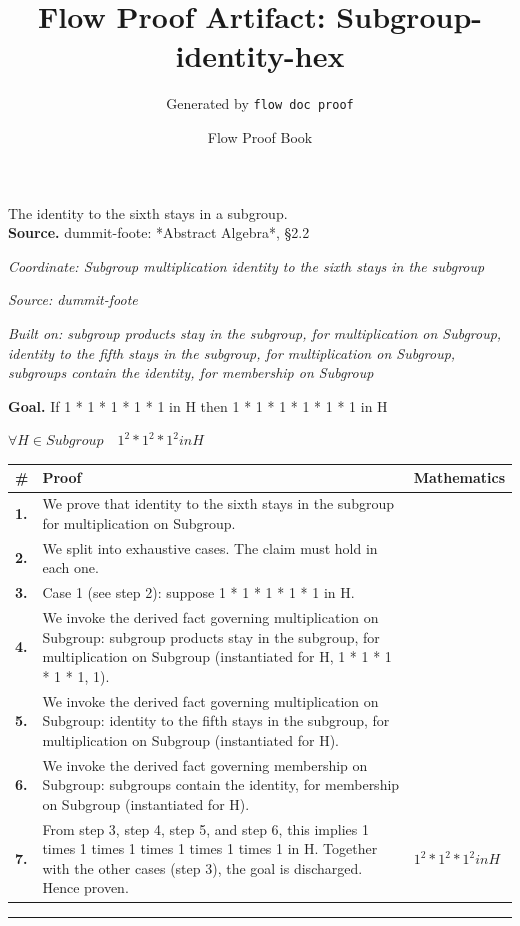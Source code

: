 \documentclass[11pt]{article}
\title{Flow Proof Artifact: Subgroup-identity-hex}
\author{Generated by \texttt{flow doc proof}}
\date{Flow Proof Book}
\theoremstyle{definition}
\begin{document}
\maketitle
The identity to the sixth stays in a subgroup.\\[0.5em]
\textbf{Source.} dummit-foote: *Abstract Algebra*, §2.2\\[0.5em]
\bigskip
{}\par
\smallskip\noindent\textit{Coordinate: Subgroup \cdot multiplication \cdot identity to the sixth stays in the subgroup}\par
\smallskip\noindent\textit{Source: dummit-foote}\par
\smallskip\noindent\textit{Built on: subgroup products stay in the subgroup, for multiplication on Subgroup, identity to the fifth stays in the subgroup, for multiplication on Subgroup, subgroups contain the identity, for membership on Subgroup}\par
\medskip
\noindent\textbf{Goal.} If 1 * 1 * 1 * 1 * 1 in H then 1 * 1 * 1 * 1 * 1 * 1 in H\par
\noindent$\displaystyle \forall H \in Subgroup\quad 1^{2} * 1^{2} * 1^{2} in H$\par
\medskip
\noindent
\begin{tabular}{@{} >{\raggedright\arraybackslash}p{} >{\raggedright\arraybackslash}p{} >{\raggedleft\arraybackslash}p{} @{}}
\textbf{\#} & \textbf{Proof} & \textbf{Mathematics} \\
\midrule
\textbf{1.} & We prove that identity to the sixth stays in the subgroup for multiplication on Subgroup. & \\[0.45em]
\textbf{2.} & We split into exhaustive cases. The claim must hold in each one. & \\[0.45em]
\textbf{3.} & Case 1 (see step 2): suppose 1 * 1 * 1 * 1 * 1 in H. & \\[0.45em]
\textbf{4.} & We invoke the derived fact governing multiplication on Subgroup: subgroup products stay in the subgroup, for multiplication on Subgroup (instantiated for H, 1 * 1 * 1 * 1 * 1, 1). & \\[0.45em]
\textbf{5.} & We invoke the derived fact governing multiplication on Subgroup: identity to the fifth stays in the subgroup, for multiplication on Subgroup (instantiated for H). & \\[0.45em]
\textbf{6.} & We invoke the derived fact governing membership on Subgroup: subgroups contain the identity, for membership on Subgroup (instantiated for H). & \\[0.45em]
\textbf{7.} & From step 3, step 4, step 5, and step 6, this implies 1 times 1 times 1 times 1 times 1 times 1 in H. Together with the other cases (step 3), the goal is discharged. Hence proven. & $\displaystyle 1^{2} * 1^{2} * 1^{2} in H$ \\[0.45em]
\bottomrule
\end{tabular}
\label{thm:Subgroup-multiplication-identity_to_the_sixth_stays_in_the_subgroup}
\par\medskip\hrule
\end{document}
